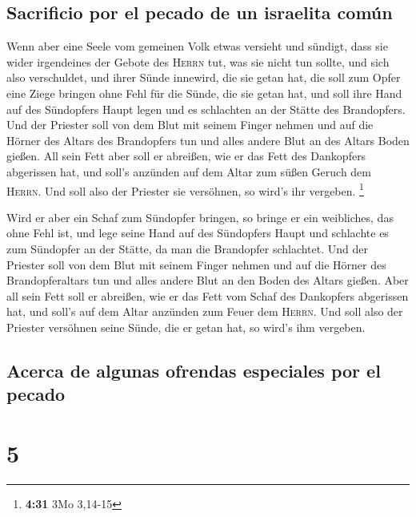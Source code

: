 \hypertarget{sacrificio-por-el-pecado-de-un-israelita-comuxfan}{%
\subsection{Sacrificio por el pecado de un israelita
común}\label{sacrificio-por-el-pecado-de-un-israelita-comuxfan}}

 Wenn aber eine Seele vom gemeinen Volk etwas versieht
und sündigt, dass sie wider irgendeines der Gebote des \textsc{Herrn}
tut, was sie nicht tun sollte, und sich also verschuldet,
 und ihrer Sünde innewird, die sie getan hat, die soll
zum Opfer eine Ziege bringen ohne Fehl für die Sünde, die sie getan hat,
 und soll ihre Hand auf des Sündopfers Haupt legen und es
schlachten an der Stätte des Brandopfers.  Und der
Priester soll von dem Blut mit seinem Finger nehmen und auf die Hörner
des Altars des Brandopfers tun und alles andere Blut an des Altars Boden
gießen.  All sein Fett aber soll er abreißen, wie er das
Fett des Dankopfers abgerissen hat, und soll's anzünden auf dem Altar
zum süßen Geruch dem \textsc{Herrn}. Und soll also der Priester sie
versöhnen, so wird's ihr vergeben. \footnote{\textbf{4:31} 3Mo 3,14-15}

 Wird er aber ein Schaf zum Sündopfer bringen, so bringe
er ein weibliches, das ohne Fehl ist,  und lege seine
Hand auf des Sündopfers Haupt und schlachte es zum Sündopfer an der
Stätte, da man die Brandopfer schlachtet.  Und der
Priester soll von dem Blut mit seinem Finger nehmen und auf die Hörner
des Brandopferaltars tun und alles andere Blut an den Boden des Altars
gießen.  Aber all sein Fett soll er abreißen, wie er das
Fett vom Schaf des Dankopfers abgerissen hat, und soll's auf dem Altar
anzünden zum Feuer dem \textsc{Herrn}. Und soll also der Priester
versöhnen seine Sünde, die er getan hat, so wird's ihm vergeben.

\hypertarget{acerca-de-algunas-ofrendas-especiales-por-el-pecado}{%
\subsection{Acerca de algunas ofrendas especiales por el
pecado}\label{acerca-de-algunas-ofrendas-especiales-por-el-pecado}}

\hypertarget{section-4}{%
\section{5}\label{section-4}}

